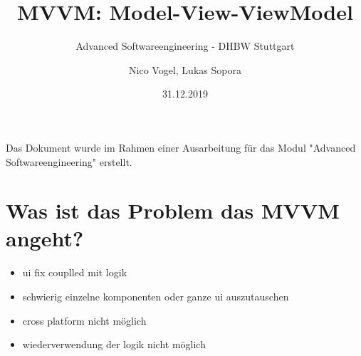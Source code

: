 \documentclass[titlepage=false,12pt]{scrreprt}
\title{MVVM: Model-View-ViewModel}
\subtitle{Advanced Softwareengineering - DHBW Stuttgart}
\author{Nico Vogel, Lukas Sopora}
\date{31.12.2019}
\begin{document}
	\maketitle
	
	\newpage


	Das Dokument wurde im Rahmen einer Ausarbeitung für das Modul "Advanced Softwareengineering" erstellt.


	\newpage

	{\renewcommand\clearpage\relax
		\tableofcontents}
	\newpage


	\chapter{Was ist das Problem das MVVM angeht?}
	\begin{itemize}
		\item ui fix couplled mit logik
		\item schwierig einzelne komponenten oder ganze ui auszutauschen
		\item cross platform nicht möglich
		\item wiederverwendung der logik nicht möglich
	\end{itemize}
\end{document}
